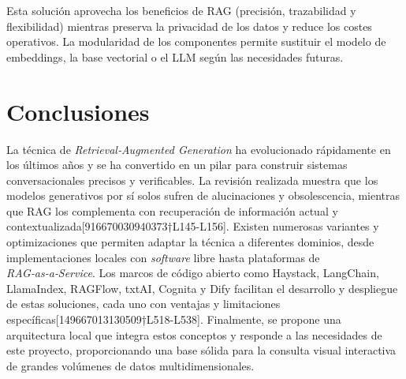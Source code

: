 Esta solución aprovecha los beneficios de RAG (precisión, trazabilidad y flexibilidad) mientras preserva la privacidad de los datos y reduce los costes operativos.  La modularidad de los componentes permite sustituir el modelo de embeddings, la base vectorial o el LLM según las necesidades futuras.

\section{Conclusiones}

La técnica de \textit{Retrieval‑Augmented Generation} ha evolucionado rápidamente en los últimos años y se ha convertido en un pilar para construir sistemas conversacionales precisos y verificables.  La revisión realizada muestra que los modelos generativos por sí solos sufren de alucinaciones y obsolescencia, mientras que RAG los complementa con recuperación de información actual y contextualizada[916670030940373†L145-L156].  Existen numerosas variantes y optimizaciones que permiten adaptar la técnica a diferentes dominios, desde implementaciones locales con \textit{software} libre hasta plataformas de \textit{RAG‑as‑a‑Service}.  Los marcos de código abierto como Haystack, LangChain, LlamaIndex, RAGFlow, txtAI, Cognita y Dify facilitan el desarrollo y despliegue de estas soluciones, cada uno con ventajas y limitaciones específicas[149667013130509†L518-L538].  Finalmente, se propone una arquitectura local que integra estos conceptos y responde a las necesidades de este proyecto, proporcionando una base sólida para la consulta visual interactiva de grandes volúmenes de datos multidimensionales.
